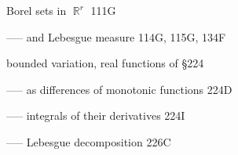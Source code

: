 \indexmedskip


























































































Borel sets in $\BbbR^r$ 111G

----- and Lebesgue measure 114G, 115G, 134F

bounded variation, real functions of \S224

----- as differences of monotonic functions 224D

----- integrals of their derivatives 224I

----- Lebesgue decomposition 226C


























